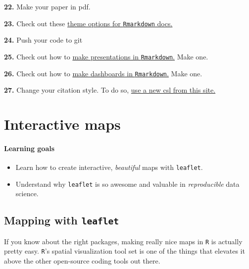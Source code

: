 \documentclass[
]{book}
\begin{document}
\textbf{22.} Make your paper in pdf.

\textbf{23.} Check out these \href{https://www.datadreaming.org/post/r-markdown-theme-gallery/}{theme options for \texttt{Rmarkdown} docs.}

\textbf{24.} Push your code to git

\textbf{25.} Check out how to \href{https://rmarkdown.rstudio.com/lesson-11.html}{make presentations in \texttt{Rmarkdown}.} Make one.

\textbf{26.} Check out how to \href{https://rmarkdown.rstudio.com/lesson-12.html}{make dashboards in \texttt{Rmarkdown}.} Make one.

\textbf{27.} Change your citation style. To do so, \href{https://github.com/citation-style-language/styles}{use a new csl from this site.}

\hypertarget{interactive-maps}{%
\chapter{Interactive maps}\label{interactive-maps}}

\hypertarget{learning-goals-12}{%
\subsubsection*{Learning goals}\label{learning-goals-12}}

\begin{itemize}
\item
  Learn how to create interactive, \emph{beautiful} maps with \texttt{leaflet}.
\item
  Understand why \texttt{leaflet} is so awesome and valuable in \emph{reproducible} data science.
\end{itemize}

\hypertarget{mapping-with-leaflet}{%
\section*{\texorpdfstring{Mapping with \texttt{leaflet}}{Mapping with leaflet}}\label{mapping-with-leaflet}}

If you know about the right packages, making really nice maps in \texttt{R} is actually pretty easy. \texttt{R}'s spatial visualization tool set is one of the things that elevates it above the other open-source coding tools out there.
\end{document}
